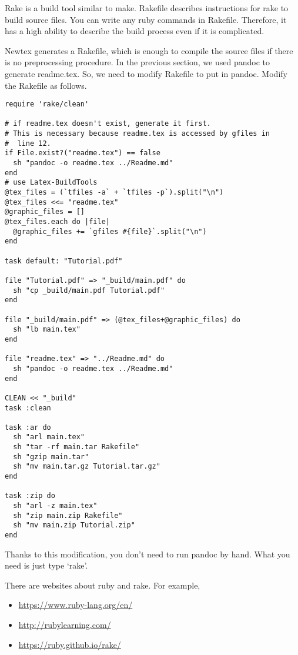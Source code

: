 Rake is a build tool similar to make.
Rakefile describes instructions for rake to build source files.
You can write any ruby commands in Rakefile.
Therefore, it has a high ability to describe the build process even if it is complicated.

Newtex generates a Rakefile, which is enough to compile the source files if there is no preprocessing procedure.
In the previous section, we used pandoc to generate readme.tex.
So, we need to modify Rakefile to put in pandoc.
Modify the Rakefile as follows.
\begin{verbatim}
require 'rake/clean'

# if readme.tex doesn't exist, generate it first.
# This is necessary because readme.tex is accessed by gfiles in
#  line 12.
if File.exist?("readme.tex") == false
  sh "pandoc -o readme.tex ../Readme.md"
end
# use Latex-BuildTools
@tex_files = (`tfiles -a` + `tfiles -p`).split("\n")
@tex_files <<= "readme.tex"
@graphic_files = []
@tex_files.each do |file|
  @graphic_files += `gfiles #{file}`.split("\n")
end

task default: "Tutorial.pdf"

file "Tutorial.pdf" => "_build/main.pdf" do
  sh "cp _build/main.pdf Tutorial.pdf"
end

file "_build/main.pdf" => (@tex_files+@graphic_files) do
  sh "lb main.tex"
end

file "readme.tex" => "../Readme.md" do
  sh "pandoc -o readme.tex ../Readme.md"
end

CLEAN << "_build"
task :clean

task :ar do
  sh "arl main.tex"
  sh "tar -rf main.tar Rakefile"
  sh "gzip main.tar"
  sh "mv main.tar.gz Tutorial.tar.gz"
end

task :zip do
  sh "arl -z main.tex"
  sh "zip main.zip Rakefile"
  sh "mv main.zip Tutorial.zip"
end
\end{verbatim}

Thanks to this modification, you don't need to run pandoc by hand.
What you need is just type `rake'.

There are websites about ruby and rake.
For example,
\begin{itemize}
\item \url{https://www.ruby-lang.org/en/}
\item \url{http://rubylearning.com/}
\item \url{https://ruby.github.io/rake/}
\end{itemize}

